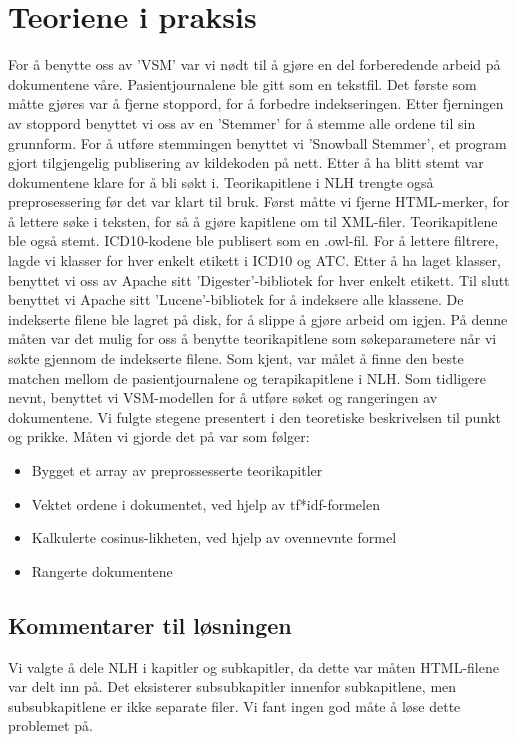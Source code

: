 \section{Teoriene i praksis}
For å benytte oss av 'VSM' var vi nødt til å gjøre en del forberedende arbeid på dokumentene våre. Pasientjournalene ble gitt som en tekstfil. Det første som måtte gjøres var å fjerne stoppord, for å forbedre indekseringen. Etter fjerningen av stoppord benyttet vi oss av en 'Stemmer' for å stemme alle ordene til sin grunnform. For å utføre stemmingen benyttet vi 'Snowball Stemmer', et program gjort tilgjengelig publisering av kildekoden på nett. 
Etter å ha blitt stemt var dokumentene klare for å bli søkt i.
Teorikapitlene i NLH trengte også preprosessering før det var klart til bruk. Først måtte vi fjerne HTML-merker, for å lettere søke i teksten, for så å gjøre kapitlene om til XML-filer. Teorikapitlene ble også stemt.
ICD10-kodene ble publisert som en .owl-fil. For å lettere filtrere, lagde vi klasser for hver enkelt etikett i ICD10 og ATC.
Etter å ha laget klasser, benyttet vi oss av Apache sitt 'Digester'-bibliotek for hver enkelt etikett. 
Til slutt benyttet vi Apache sitt 'Lucene'-bibliotek for å indeksere alle klassene. De indekserte filene ble lagret på disk, for å slippe å gjøre arbeid om igjen. På denne måten var det mulig for oss å benytte teorikapitlene som søkeparametere når vi søkte gjennom de indekserte filene. 
Som kjent, var målet å finne den beste matchen mellom de pasientjournalene og terapikapitlene i NLH. 
Som tidligere nevnt, benyttet vi VSM-modellen for å utføre søket og rangeringen av dokumentene. Vi fulgte stegene presentert i den teoretiske beskrivelsen til punkt og prikke. Måten vi gjorde det på var som følger:
\begin{itemize}
\item{Bygget et array av preprossesserte teorikapitler}
\item{Vektet ordene i dokumentet, ved hjelp av tf*idf-formelen}
\item{Kalkulerte cosinus-likheten, ved hjelp av ovennevnte formel}
\item{Rangerte dokumentene}
\end{itemize}

\subsection{Kommentarer til løsningen}
Vi valgte å dele NLH i kapitler og subkapitler, da dette var måten HTML-filene var delt inn på. Det eksisterer subsubkapitler innenfor subkapitlene, men subsubkapitlene er ikke separate filer. Vi fant ingen god måte å løse dette problemet på. 